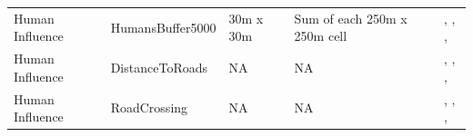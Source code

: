 \documentclass[abstract=on,10pt,a4paper,bibliography=totocnumbered]{scrartcl}
\begin{document}
\begin{table}[h]
\begin{center}
{\begin{tabular}{llp{4cm}p{4cm}p{7cm}}
      \hdashline
      Human Influence
        & HumansBuffer5000
          & 30m x 30m
            & Sum of each 250m x 250m cell
              & \cite{Facebook.2019}, \cite{OpenStreetMap.2019}, \cite{Chen.2015}, \cite{Xiong.2017}\\
      Human Influence
        & DistanceToRoads
          & NA
            & NA
              & \cite{Facebook.2019}, \cite{OpenStreetMap.2019}, \cite{Chen.2015}, \cite{Xiong.2017}\\
      Human Influence
        & RoadCrossing
          & NA
            & NA
              & \cite{Facebook.2019}, \cite{OpenStreetMap.2019}, \cite{Chen.2015}, \cite{Xiong.2017}\\
      \hline
      \end{tabular}
    }
  \end{center}
\end{table}

\newpage
\end{document}
